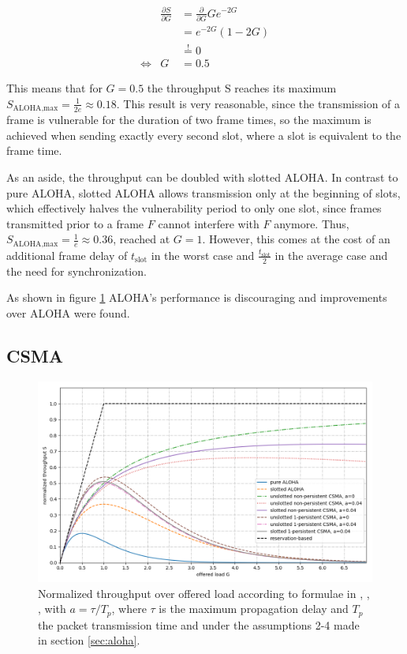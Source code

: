 \begin{eqnarray}
	& \frac{\partial S}{\partial G} & = \frac{\partial}{\partial G} Ge^{-2G} \\ 
	& & = e^{-2G}(1-2G) \\
	& & \stackrel{!}{=} 0 \\
	\Leftrightarrow & G & = 0.5
\end{eqnarray}
	
This means that for $G=0.5$ the throughput S reaches its maximum $S_\text{ALOHA,max} = \frac{1}{2e} \approx 0.18$. This result is very reasonable, since the transmission of a frame is vulnerable for the duration of two frame times, so the maximum is achieved when sending exactly every second slot, where a slot is equivalent to the frame time.

As an aside, the throughput can be doubled with slotted ALOHA. In contrast to pure ALOHA, slotted ALOHA allows transmission only at the beginning of slots, which effectively halves the vulnerability period to only one slot, since frames transmitted prior to a frame $F$ cannot interfere with $F$ anymore. Thus, $S_\text{ALOHA,max} = \frac{1}{e} \approx 0.36$, reached at $G=1$. However, this comes at the cost of an additional frame delay of $t_\text{slot}$ in the worst case and $\frac{t_\text{slot}}{2}$ in the average case and the need for synchronization. 

As shown in figure \ref{fig:aloha-csma-performance} ALOHA's performance is discouraging and improvements over ALOHA were found. 

\subsection{CSMA}
\label{sec:csma}

\begin{figure}[tb]
	\label{fig:aloha-csma-performance}
	\begin{center}
		\includegraphics[width=\textwidth]{pictures/aloha_csma_performance}
	\end{center}
	\caption{Normalized throughput over offered load according to formulae in \cite{Garg07}, \cite{Bachir10},  \cite{Tanenbaum02}, with $a=\tau/T_p$, where $\tau$ is the maximum propagation delay and $T_p$ the packet transmission time and under the assumptions 2-4 made in section \ref{sec:aloha}. }
\end{figure}

